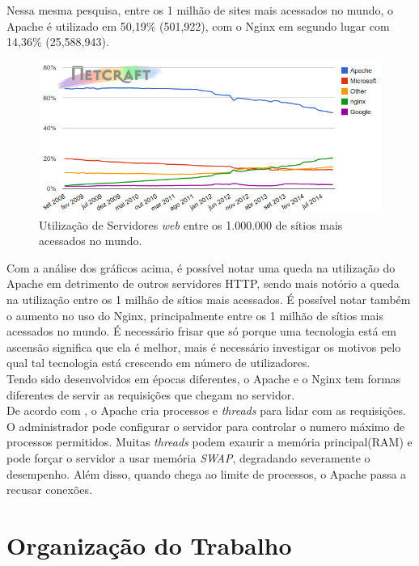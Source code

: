 Nessa mesma pesquisa, entre os 1 milhão de sites mais acessados no mundo, o Apache é utilizado em 50,19\% (501,922), com o Nginx em segundo lugar com 14,36\% (25,588,943).\\

\begin{figure}[h!]
	\centering
	\includegraphics[width=0.6\linewidth]{figuras/grafico2} 
	\caption{Utilização de Servidores \textit{web} entre os 1.000.000 de sítios mais acessados no mundo.}
	\label{fig:webservers-utilizacao-milhao}
\end{figure}

Com a análise dos gráficos acima, é possível notar uma queda na utilização do Apache em detrimento de outros servidores HTTP, sendo mais notório a queda na utilização entre os 1 milhão de sítios mais acessados. É possível notar também o aumento no uso do Nginx, principalmente entre os 1 milhão de sítios mais acessados no mundo. É necessário frisar que só porque uma tecnologia está em ascensão significa que ela é melhor, mais é necessário investigar os motivos pelo qual tal tecnologia está crescendo em número de utilizadores.\\
Tendo sido desenvolvidos em épocas diferentes, o Apache e o Nginx tem formas diferentes de servir as requisições que chegam no servidor.\\
De acordo com , o Apache cria processos e \textit{threads} para lidar com as requisições. O administrador pode configurar o servidor para controlar o numero máximo de processos permitidos. Muitas \textit{threads} podem exaurir a memória principal(RAM) e pode forçar o servidor a usar memória \textit{SWAP}, degradando severamente o desempenho. Além disso, quando chega ao limite de processos, o Apache passa a recusar conexões.

\section{Organização do Trabalho}

